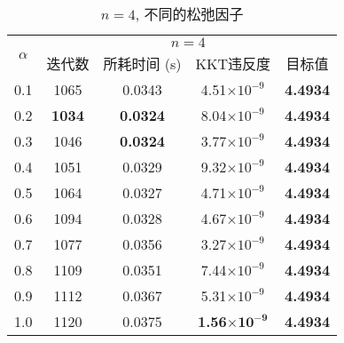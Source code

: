 \begin{table}[htbp]
	\renewcommand{\captionfont}{\small}
    \centering
    \caption{$n=4$, 不同的松弛因子}
    \label{n4alpha}
    \vskip 4mm
    \begin{tabular}{c|c|c|c|c}
        \hline
        \multirow{2}{*}{$\alpha$} & \multicolumn{4}{c}{$n=4$}\\\cline{2-5}
          & 迭代数 & 所耗时间 (s) & KKT违反度 & 目标值\\\hline
        0.1 & 1065 & 0.0343 & 4.51$\times10^{-9}$ & \textbf{4.4934} \\\hline
        0.2 & \textbf{1034} & \textbf{0.0324} & 8.04$\times10^{-9}$ & \textbf{4.4934} \\\hline
        0.3 & 1046 & \textbf{0.0324} & 3.77$\times10^{-9}$ & \textbf{4.4934} \\\hline
        0.4 & 1051 & 0.0329 & 9.32$\times10^{-9}$ & \textbf{4.4934} \\\hline
        0.5 & 1064 & 0.0327 & 4.71$\times10^{-9}$ & \textbf{4.4934} \\\hline
        0.6 & 1094 & 0.0328 & 4.67$\times10^{-9}$ & \textbf{4.4934} \\\hline
        0.7 & 1077 & 0.0356 & 3.27$\times10^{-9}$ & \textbf{4.4934} \\\hline
        0.8 & 1109 & 0.0351 & 7.44$\times10^{-9}$ & \textbf{4.4934} \\\hline
        0.9 & 1112 & 0.0367 & 5.31$\times10^{-9}$ & \textbf{4.4934} \\\hline
        1.0 & 1120 & 0.0375 & \textbf{1.56$\mathbf{\times10^{-9}}$} & \textbf{4.4934} \\\hline
    \end{tabular}
\end{table}

